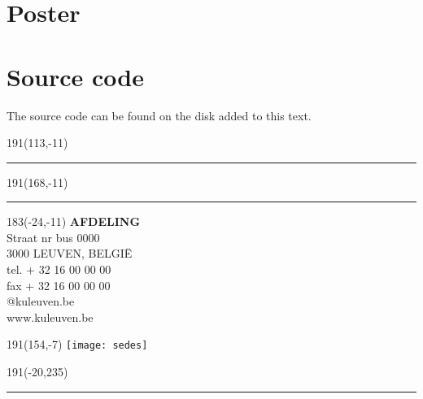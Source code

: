 \documentclass[12pt,a4paper,oneside]{book}
\begin{document}
\chapter{Poster}


\chapter{Source code}

The source code can be found on the disk added to this text.



\newpage
\thispagestyle{empty}
\sffamily
%
\begin{textblock}{191}(113,-11)
{\color{blueline}\rule{160pt}{5.5pt}}
\end{textblock}
%
\begin{textblock}{191}(168,-11)
{\color{blueline}\rule{5.5pt}{59pt}}
\end{textblock}
%
\begin{textblock}{183}(-24,-11)
\textblockcolour{}
\flushright
\fontsize{7}{7.5}\selectfont
\textbf{AFDELING}\\
Straat nr bus 0000\\
3000 LEUVEN, BELGI\"{E}\\
tel. + 32 16 00 00 00\\
fax + 32 16 00 00 00\\
@kuleuven.be\\
www.kuleuven.be\\
\end{textblock}
%
\begin{textblock}{191}(154,-7)
\textblockcolour{}
\texttt{[image: sedes]}
\end{textblock}
%
\begin{textblock}{191}(-20,235)
{\color{bluetitle}\rule{544pt}{55pt}}
\end{textblock}
\end{document}
